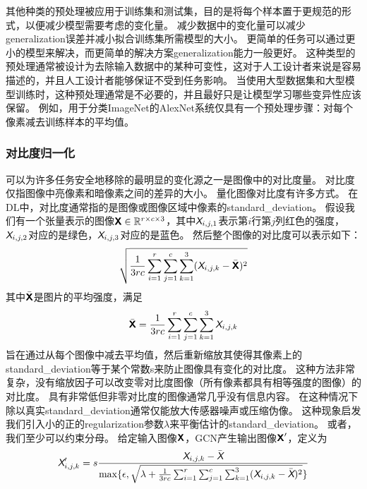 其他种类的预处理被应用于训练集和测试集，目的是将每个样本置于更规范的形式，以便减少模型需要考虑的变化量。
减少数据中的变化量可以减少\gls{generalization}误差并减小拟合训练集所需模型的大小。
更简单的任务可以通过更小的模型来解决，而更简单的解决方案\gls{generalization}能力一般更好。
这种类型的预处理通常被设计为去除输入数据中的某种可变性，这对于人工设计者来说是容易描述的，并且人工设计者能够保证不受到任务影响。
当使用大型数据集和大型模型训练时，这种预处理通常是不必要的，并且最好只是让模型学习哪些变异性应该保留。%
例如，用于分类ImageNet的AlexNet系统仅具有一个预处理步骤：对每个像素减去训练样本的平均值\citep{Krizhevsky-2012}。

\subsubsection{对比度归一化}
\label{sec:contrast_normalization}

可以为许多任务安全地移除的最明显的变化源之一是图像中的对比度量。
对比度仅指图像中亮像素和暗像素之间的差异的大小。
量化图像对比度有许多方式。
在\gls{DL}中，对比度通常指的是图像或图像区域中像素的\gls{standard_deviation}。
假设我们有一个张量表示的图像$\textsf{\textbf{X}} \in\mathbb{R}^{r\times c\times 3}$，其中$\textit{\textsf{X}}_{i,j,1}$表示第$i$行第$j$列红色的强度，$\textit{\textsf{X}}_{i,j,2}$对应的是绿色，$\textit{\textsf{X}}_{i,j,3}$对应的是蓝色。
然后整个图像的对比度可以表示如下：
\begin{align}
\label{eqn:121}
\sqrt{\frac{1}{3rc}\sum_{i=1}^{r} \sum_{j=1}^{c}\sum_{k=1}^{3} (\textit{\textsf{X}}_{i,j,k} - \bar{\textsf{\textbf{X}}} )^2}
\end{align}
其中$\bar{\textsf{\textbf{X}}}$是图片的平均强度，满足
\begin{align}
\label{eqn:122}
 \bar{\textsf{\textbf{X}}} =  \frac{1}{3rc}\sum_{i=1}^{r} \sum_{j=1}^{c}\sum_{k=1}^{3}\textit{\textsf{X}}_{i,j,k}
\end{align}
旨在通过从每个图像中减去平均值，然后重新缩放其使得其像素上的\gls{standard_deviation}等于某个常数s来防止图像具有变化的对比度。
这种方法非常复杂，没有缩放因子可以改变零对比度图像（所有像素都具有相等强度的图像）的对比度。
具有非常低但非零对比度的图像通常几乎没有信息内容。
在这种情况下除以真实\gls{standard_deviation}通常仅能放大传感器噪声或压缩伪像。
这种现象启发我们引入小的正的\gls{regularization}参数$\lambda$来平衡估计的\gls{standard_deviation}。
或者，我们至少可以约束分母。
给定输入图像$\textsf{\textbf{X}}$，\gls{GCN}产生输出图像$\textsf{\textbf{X}}'$，定义为
\begin{align}
\label{eqn:123}
\textit{\textsf{X}}'_{i,j,k} = s\frac{\textit{\textsf{X}}_{i,j,k} - \bar{\textit{\textsf{X}}}}{\max\{ \epsilon, \sqrt{ \lambda + 
{\frac{1}{3rc}\sum_{i=1}^{r}\sum_{j=1}^{c}\sum_{k=1}^{3}} (\textit{\textsf{X}}_{i,j,k} - \bar{\textit{\textsf{X}}} )^2} \}}
\end{align}


